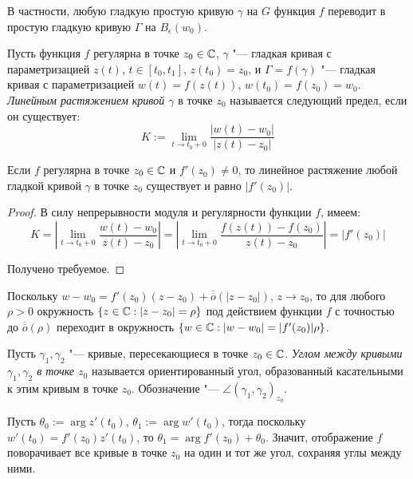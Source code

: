 \begin{unnecessary}
\begin{note}
	В частности, любую гладкую простую кривую $\gamma$ на $G$ функция $f$ переводит в простую гладкую кривую $\Gamma$ на $B_\epsilon(w_0)$.
\end{note}

\begin{definition}
	Пусть функция $f$ регулярна в точке $z_0 \in \mathbb{C}$, $\gamma$ "--- гладкая кривая с параметризацией $z(t)$, $t \in [t_0, t_1]$, $z(t_0) = z_0$, и $\Gamma = f(\gamma)$ "--- гладкая кривая с параметризацией $w(t) = f(z(t))$, $w(t_0) = f(z_0) = w_0$. \textit{Линейным растяжением кривой $\gamma$} в точке $z_0$ называется следующий предел, если он существует:
	\[K := \lim_{t \to t_0 + 0}\frac{|w(t) - w_0|}{|z(t) - z_0|}\]
\end{definition}

\begin{proposition}
	Если $f$ регулярна в точке $z_0 \in \mathbb{C}$ и $f'(z_0) \ne 0$, то линейное растяжение любой гладкой кривой $\gamma$ в точке $z_0$ существует и равно $|f'(z_0)|$.
\end{proposition}

\begin{proof}
	В силу непрерывности модуля и регулярности функции $f$, имеем:
	\[K = \left|\lim_{t \to t_0 + 0}\frac{w(t) - w_0}{z(t) - z_0}\right| = \left|\lim_{t \to t_0 + 0}\frac{f(z(t)) - f(z_0)}{z(t) - z_0}\right| = |f'(z_0)|\]
	
	Получено требуемое.
\end{proof}

\begin{note}
	Поскольку $w - w_0 = f'(z_0)(z-z_0) + \overline{\overline{o}}(|z - z_0|)$, $z \to z_0$, то для любого $\rho > 0$ окружность $\{z \in \mathbb{C} : |z - z_0| = \rho\}$ под действием функции $f$ с точностью до $\overline{\overline{o}}(\rho)$ переходит в окружность $\{w \in \mathbb{C} : |w - w_0| = |f'(z_0)|\rho\}$.
\end{note}
\end{unnecessary}

\begin{definition}
    Пусть $\gamma_1, \gamma_2$ "--- кривые, пересекающиеся в точке $z_0 \in \mathbb{C}$. \textit{Углом между кривыми $\gamma_1, \gamma_2$ в точке $z_0$} называется ориентированный угол, образованный касательными к этим кривым в точке $z_0$.  Обозначение "--- $\angle(\gamma_1, \gamma_2)_{z_0}$.
\end{definition}

\begin{unnecessary}
    \begin{note}
    	Пусть $\theta_0 := \arg{z'(t_0)}$, $\theta_1 := \arg{w'(t_0)}$, тогда поскольку $w'(t_0) = f'(z_0)z'(t_0)$, то $\theta_1 = \arg{f'(z_0)} + \theta_0$. Значит, отображение $f$ поворачивает все кривые в точке $z_0$ на один и тот же угол, сохраняя углы между ними.
    \end{note}
\end{unnecessary}

